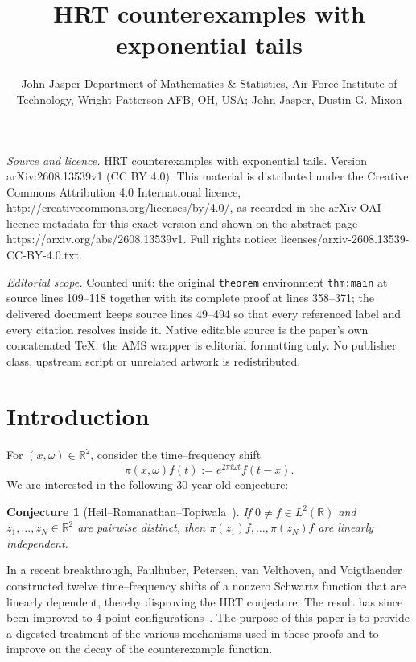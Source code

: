 \documentclass[10pt,a4paper]{amsart}
\newtheorem{conjecture}[theorem]{Conjecture}
\newcommand{\R}{\mathbb{R}}
\begin{document}
\title[HRT counterexamples with exponential tails]{HRT counterexamples with exponential tails}
\author{John Jasper Department of Mathematics \& Statistics, Air Force Institute of Technology, Wright-Patterson AFB, OH, USA; John Jasper, Dustin G. Mixon}
\date{}
\maketitle
\noindent\emph{Source and licence.} HRT counterexamples with exponential tails. Version arXiv:2608.13539v1 (CC BY 4.0). This material is distributed under the Creative Commons Attribution 4.0 International licence, http://creativecommons.org/licenses/by/4.0/, as recorded in the arXiv OAI licence metadata for this exact version and shown on the abstract page https://arxiv.org/abs/2608.13539v1. Full rights notice: licenses/arxiv-2608.13539-CC-BY-4.0.txt.\par\smallskip
\noindent\textit{Editorial scope.} Counted unit: the original \texttt{theorem} environment \texttt{thm:main} at source lines 109--118 together with its complete proof at lines 358--371; the delivered document keeps source lines 49--494 so that every referenced label and every citation resolves inside it. Native editable source is the paper's own concatenated TeX; the AMS wrapper is editorial formatting only. No publisher class, upstream script or unrelated artwork is redistributed.
\section{Introduction}

For $(x,\omega)\in\R^2$, consider the time--frequency shift
\[
  \pi(x,\omega)f(t):=e^{2\pi i\omega t}f(t-x).
\]
We are interested in the following $30$-year-old conjecture:

\begin{conjecture}[Heil--Ramanathan--Topiwala~\cite{HeilRT:96}]
If $0\neq f\in L^2(\R)$ and $z_1,\ldots,z_N\in\R^2$ are pairwise distinct,
then $\pi(z_1)f,\ldots,\pi(z_N)f$ are linearly independent.
\end{conjecture}

In a recent breakthrough, Faulhuber, Petersen, van Velthoven, and
Voigtlaender~\cite{FaulhuberPvC:26} constructed twelve time--frequency shifts of a nonzero Schwartz
function that are linearly dependent, thereby disproving the HRT conjecture.
The result has since been improved to $4$-point configurations~\cite{Oussa:26,DaiDSWY:26}.
The purpose
of this paper is to provide a digested treatment of the various mechanisms used in these proofs and to improve on the decay of the counterexample function.
\end{document}
